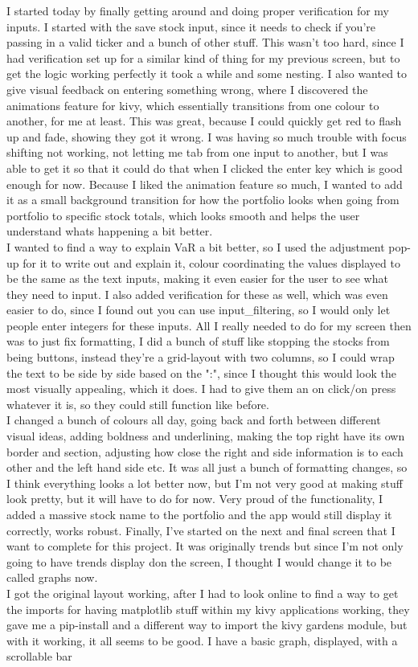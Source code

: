 \documentclass{article}
\begin{document}
I started today by finally getting around and doing proper verification for my inputs. I started with the save stock input, since it needs to check if you're passing in a valid ticker and a bunch of other stuff. This wasn't too hard, since I had verification set up for a similar kind of thing for my previous screen, but to get the logic working perfectly it took a while and some nesting. I also wanted to give visual feedback on entering something wrong, where I discovered the animations feature for kivy, which essentially transitions from one colour to another, for me at least. This was great, because I could quickly get red to flash up and fade, showing they got it wrong. I was having so much trouble with focus shifting not working, not letting me tab from one input to another, but I was able to get it so that it could do that when I clicked the enter key which is good enough for now. Because I liked the animation feature so much, I wanted to add it as a small background transition for how the portfolio looks when going from portfolio to specific stock totals, which looks smooth and helps the user understand whats happening a bit better. \\I wanted to find a way to explain VaR a bit better, so I used the adjustment pop-up for it to write out and explain it, colour coordinating the values displayed to be the same as the text inputs, making it even easier for the user to see what they need to input. I also added verification for these as well, which was even easier to do, since I found out you can use input\_filtering, so I would only let people enter integers for these inputs. All I really needed to do for my screen then was to just fix formatting, I did a bunch of stuff like stopping the stocks from being buttons, instead they're a grid-layout with two columns, so I could wrap the text to be side by side based on the ":", since I thought this would look the most visually appealing, which it does. I had to give them an on click/on press whatever it is, so they could still function like before. \\I changed a bunch of colours all day, going back and forth between different visual ideas, adding boldness and underlining, making the top right have its own border and section, adjusting how close the right and side information is to each other and the left hand side etc. It was all just a bunch of formatting changes, so I think everything looks a lot better now, but I'm not very good at making stuff look pretty, but it will have to do for now. Very proud of the functionality, I added a massive stock name to the portfolio and the app would still display it correctly, works robust. Finally, I've started on the next and final screen that I want to complete for this project. It was originally trends but since I'm not only going to have trends display don the screen, I thought I would change it to be called graphs now. \\I got the original layout working, after I had to look online to find a way to get the imports for having matplotlib stuff within my kivy applications working, they gave me a pip-install and a different way to import the kivy gardens module, but with it working, it all seems to be good. I have a basic graph, displayed, with a scrollable bar 
\end{document}
